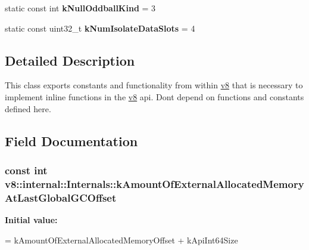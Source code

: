 \begin{DoxyCompactItemize}
\item 
\hypertarget{classv8_1_1internal_1_1Internals_a72243c5512cb5cab9d10b6f29e775180}{}static const int {\bfseries k\+Null\+Oddball\+Kind} = 3\label{classv8_1_1internal_1_1Internals_a72243c5512cb5cab9d10b6f29e775180}

\item 
\hypertarget{classv8_1_1internal_1_1Internals_a258de87ae638f06a1deebccf4fd93c3f}{}static const uint32\+\_\+t {\bfseries k\+Num\+Isolate\+Data\+Slots} = 4\label{classv8_1_1internal_1_1Internals_a258de87ae638f06a1deebccf4fd93c3f}

\end{DoxyCompactItemize}


\subsection{Detailed Description}
This class exports constants and functionality from within \hyperlink{namespacev8}{v8} that is necessary to implement inline functions in the \hyperlink{namespacev8}{v8} api. Don\textquotesingle{}t depend on functions and constants defined here. 

\subsection{Field Documentation}
\hypertarget{classv8_1_1internal_1_1Internals_a4839a352b8fc929d6f05028abe0db272}{}
\subsubsection[{k\+Amount\+Of\+External\+Allocated\+Memory\+At\+Last\+Global\+G\+C\+Offset}]{\setlength{\rightskip}{0pt plus 5cm}const int v8\+::internal\+::\+Internals\+::k\+Amount\+Of\+External\+Allocated\+Memory\+At\+Last\+Global\+G\+C\+Offset\hspace{0.3cm}{\ttfamily [static]}}\label{classv8_1_1internal_1_1Internals_a4839a352b8fc929d6f05028abe0db272}
{\bfseries Initial value\+:}
\begin{DoxyCode}
=
      kAmountOfExternalAllocatedMemoryOffset + kApiInt64Size
\end{DoxyCode}
\hypertarget{classv8_1_1internal_1_1Internals_a715b5e2c414c5efd35c5e01d4f2b9f85}{}

